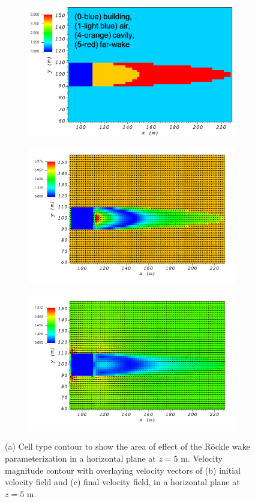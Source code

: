 \begin{figure}[H]
    \centering
    \begin{subfigure}{\textwidth}
    \centering
    \includegraphics[width=10.3cm,keepaspectratio]{Images/wake_z_5_1_init_icell.png}
    \caption{}
    \end{subfigure}
    \begin{subfigure}{\textwidth}
    \centering
    \includegraphics[width=11.0cm,keepaspectratio]{Images/wake_z_5_1_init_vel.png}
    \caption{}
    \end{subfigure}
    \begin{subfigure}{\textwidth}
    \centering
    \includegraphics[width=11.0cm,keepaspectratio]{Images/wake_z_5_1_final.png}
    \caption{}
    \end{subfigure}
    \caption{(a) Cell type contour to show the area of effect of the R\"{o}ckle wake parameterization in a horizontal plane at $z=5$ m. Velocity magnitude contour with overlaying velocity vectors of (b) initial velocity field and (c) final velocity field, in a horizontal plane at $z=5$ m.}
\end{figure}

